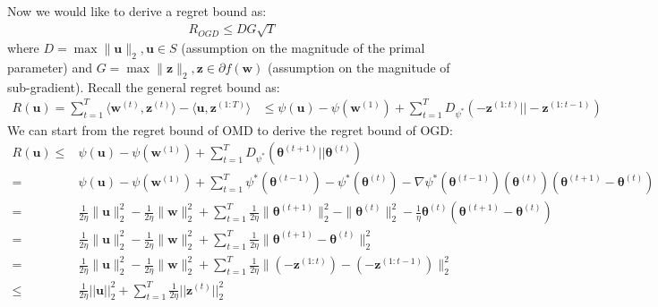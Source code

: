 \documentclass[11pt]{article}
\newcommand{\btheta}{\boldsymbol{\theta}}
\newcommand{\bz}{\boldsymbol{z}}
\newcommand{\bw}{\boldsymbol{w}}
\newcommand{\bu}{\boldsymbol{u}}
\begin{document}
Now we would like to derive a regret bound as:
\begin{equation*}
\begin{split}
R_{OGD} \leq DG\sqrt{T}
\end{split}
\end{equation*}
where $D=\max\|\bu\|_2, \bu \in S$ (assumption on the magnitude of the primal parameter) and $G=\max \| \bz \|_2, \bz \in \partial f(\bw)$ (assumption on the magnitude of sub-gradient).
%
%
Recall the general regret bound as:
%
\begin{equation*}
\begin{split}
R(\bu)=\sum_{t=1}^{T} \langle \bw^{(t)}, \bz^{(t)} \rangle
-\langle \bu,\bz^{(1:T)} \rangle
&\leq \psi(\bu)
-\psi(\boldsymbol{w}^{(1)}) 
+\sum_{t=1}^{T} D_{\psi^*} (-\bz^{(1:t)} || -\bz^{(1:t-1)})
\end{split}
\end{equation*}
%
We can start from the regret bound of OMD to derive the regret bound of OGD:
\begin{equation*}
\begin{split}
R(\bu) \leq
& \psi(\bu)
 -  \psi(\bw^{(1)}) 
 +\sum_{t=1}^{T} D_{\psi^*} (\btheta^{(t+1)} || \btheta^{(t)})\\
= & \psi(\bu)
-  \psi(\bw^{(1)}) 
+ \sum_{t=1}^{T} \psi^*(\btheta^{(t-1)}) - \psi^*(\btheta^{(t)}) - \nabla \psi^*(\btheta^{(t-1)})(\btheta^{(t)}) (\btheta^{(t+1)} - \btheta^{(t)})\\
= & \frac{1}{2\eta} \|\bu\|_2^2-\frac{1}{2\eta} \|\bw\|_2^2+\sum_{t=1}^T \frac{1}{2\eta} \|\btheta^{(t+1)}\|_2^2 - \|\btheta^{(t)}\|_2^2 - \frac{1}{\eta} \btheta^{(t)} (\btheta^{(t+1)}-\btheta^{(t)})\\
= & \frac{1}{2\eta} \|\bu\|_2^2-\frac{1}{2\eta} \|\bw\|_2^2+\sum_{t=1}^T \frac{1}{2\eta} \|\btheta^{(t+1)} - \btheta^{(t)}\|_2^2\\
= & \frac{1}{2\eta} \|\bu\|_2^2-\frac{1}{2\eta} \|\bw\|_2^2+\sum_{t=1}^T \frac{1}{2\eta} \|(-\bz^{(1:t)}) - (-\bz^{(1:t-1)})\|_2^2\\
%
\leq & \frac{1}{2 \eta}||\bu||_2^2 + \sum_{t=1}^T \frac{1}{2 \eta} ||\bz^{(t)}||_2^2 
\end{split}
\end{equation*}
\end{document}
